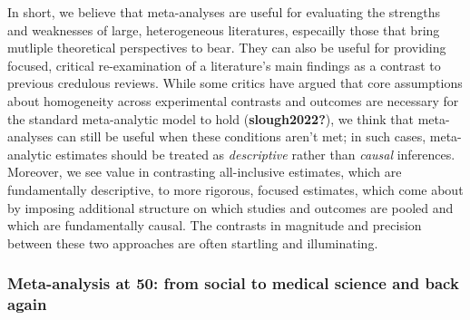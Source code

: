 \documentclass[
  man]{apa6}
\begin{document}
In short, we believe that meta-analyses are useful for evaluating the strengths and weaknesses of large, heterogeneous literatures, especailly those that bring mutliple theoretical perspectives to bear. They can also be useful for providing focused, critical re-examination of a literature's main findings as a contrast to previous credulous reviews. While some critics have argued that core assumptions about homogeneity across experimental contrasts and outcomes are necessary for the standard meta-analytic model to hold (\textbf{slough2022?}), we think that meta-analyses can still be useful when these conditions aren't met; in such cases, meta-analytic estimates should be treated as \emph{descriptive} rather than \emph{causal} inferences. Moreover, we see value in contrasting all-inclusive estimates, which are fundamentally descriptive, to more rigorous, focused estimates, which come about by imposing additional structure on which studies and outcomes are pooled and which are fundamentally causal. The contrasts in magnitude and precision between these two approaches are often startling and illuminating.

\subsubsection{Meta-analysis at 50: from social to medical science and back again}\label{meta-analysis-at-50-from-social-to-medical-science-and-back-again}
\end{document}

